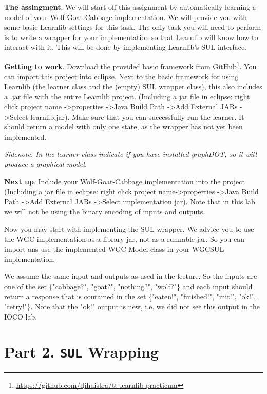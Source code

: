 \documentclass[a4paper]{article}
\begin{document}
\textbf{The assingment}. We will start off this assignment by automatically learning a model of your Wolf-Goat-Cabbage implementation. We will provide you with some basic Learnlib settings for this task. The only task you will need to perform is to write a wrapper for your implementation so that Learnlib will know how to interact with it.  This will be done by implementing Learnlib's SUL interface.

\textbf{Getting to work}. Download the provided basic framework from GitHub\footnote{\url{https://github.com/djhuistra/tt-learnlib-practicum}}. You can import this project into eclipse. Next to the basic framework for using Learnlib (the learner class and the (empty) SUL wrapper class), this also includes a .jar file with the entire Learnlib project. (Including a jar file in eclipse: right click project name  -\textgreater properties  -\textgreater Java Build Path -\textgreater Add External JARs -\textgreater Select learnlib.jar). Make sure that you can successfully run the learner. It should return a model with only one state, as the wrapper has not yet been implemented.

\emph{Sidenote. In the learner class indicate if you have installed graphDOT, so it will produce a graphical model.}

\textbf{Next up}. Include your Wolf-Goat-Cabbage implementation into the project (Including a jar file in eclipse: right click project name-\textgreater properties  -\textgreater Java Build Path  -\textgreater  Add External JARs  -\textgreater  Select implementation jar). Note that in this lab we will not be using the binary encoding of inputs and outputs. 

Now you may start with implementing the SUL wrapper. We advice you to use the WGC implementation as a library jar, not as a runnable jar. So you can import ans use the implemented WGC Model class in your WGCSUL implementation.

We assume the same input and outputs as used in the lecture. So the inputs are one of the set \{"cabbage?", "goat?", "nothing?", "wolf?"\} and each input should return a response that is contained in the set \{"eaten!", "finished!", "init!", "ok!", "retry!"\}. Note that the "ok!" output is new, i.e. we did not see this output in the IOCO lab.

\section*{Part 2. \texttt{SUL} Wrapping}
\end{document}
